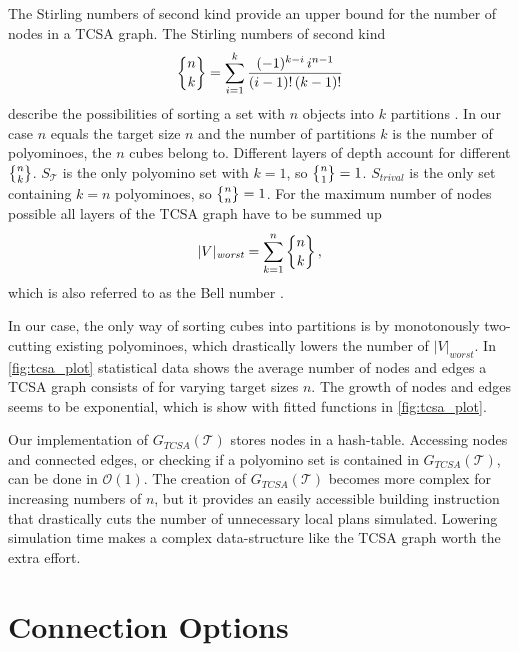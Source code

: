 The Stirling numbers of second kind provide an upper bound for the number of nodes in a TCSA graph.
The Stirling numbers of second kind
\begin{equation}
\bracenom{n}{k} = \sum_{i=1}^{k} \frac{(-1)^{k-i} \, i^{n-1}}{(i-1)! \, (k-1)!}
\end{equation}
describe the possibilities of sorting a set with $n$ objects into $k$ partitions \cite{jelliss1991}.
In our case $n$ equals the target size $n$ and the number of partitions $k$ is the number of polyominoes, the $n$ cubes belong to.
Different layers of depth account for different $\bracenom{n}{k}$.
$S_\mathcal{T}$ is the only polyomino set with $k=1$, so $\bracenom{n}{1} = 1$.
$S_\textit{trival}$ is the only set containing $k=n$ polyominoes, so $\bracenom{n}{n} = 1$.
For the maximum number of nodes possible all layers of the TCSA graph have to be summed up
\begin{equation}
|V|_\textit{worst} = \sum_{k=1}^{n} \bracenom{n}{k} \, ,
\end{equation}
which is also referred to as the Bell number \cite{jelliss1991}.

In our case, the only way of sorting cubes into partitions is by monotonously two-cutting existing polyominoes, which drastically lowers the number of $|V|_\textit{worst}$.
In \autoref{fig:tcsa_plot} statistical data shows the average number of nodes and edges a TCSA graph consists of for varying target sizes $n$.
The growth of nodes and edges seems to be exponential, which is show with fitted functions in \autoref{fig:tcsa_plot}. 

Our implementation of $G_{\textit{TCSA}}(\mathcal{T})$ stores nodes in a hash-table.
Accessing nodes and connected edges, or checking if a polyomino set is contained in $G_{\textit{TCSA}}(\mathcal{T})$, can be done in  $\mathcal{O}(1)$.
The creation of $G_{\textit{TCSA}}(\mathcal{T})$ becomes more complex for increasing numbers of $n$, but it provides an easily accessible building instruction that drastically cuts the number of unnecessary local plans simulated.
Lowering simulation time makes a complex data-structure like the TCSA graph worth the extra effort.


\section{Connection Options}
\label{sec:connect_options}

